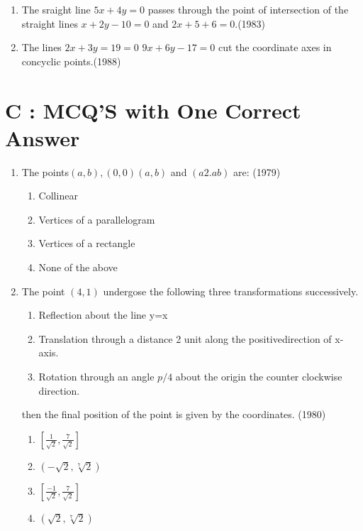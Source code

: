 \documentclass[12pt]{article}
\begin{document}
\begin{enumerate}

\item  The sraight line $5x+4y=0$ passes through the point of intersection of the straight lines $x+2y-10=0$ and $2x+5+6=0$.(1983)\\
\item The lines $2x+3y=19=0$ $9x+6y-17=0$ cut the coordinate axes in concyclic points.(1988)\\
\end{enumerate}

\section*{C  :   MCQ'S with One Correct Answer}

\begin{enumerate}
\item The points$(a,b),(0,0)(a,b)$ and $(a2.ab)$ are: (1979)
\begin{enumerate}
\item Collinear
\item Vertices of a parallelogram
\item Vertices of a rectangle
\item None of the above
\end{enumerate}
\item The point $(4,1)$ undergose the following three transformations successively.
\begin{enumerate}[i]
\item Reflection about the line y=x\\
\item Translation through a distance 2 unit along the positivedirection of x-axis.\\
\item Rotation through an angle $p/4$ about the origin the counter clockwise direction.\\
\end{enumerate}

then the final position of the point is given by the coordinates. (1980)
\begin{enumerate}
\item  $ [\frac{1}{\sqrt{2}},\frac{7}{\sqrt{2}}]$  
\item  $(-\sqrt{2}, \sqrt[7]{2})$  
\item  $[\frac{-1}{\sqrt{2}},\frac{7}{\sqrt{2}}]$
\item  $(\sqrt{2}, \sqrt[7]{2})$
\end{enumerate}


\end{enumerate}
\end{document}
